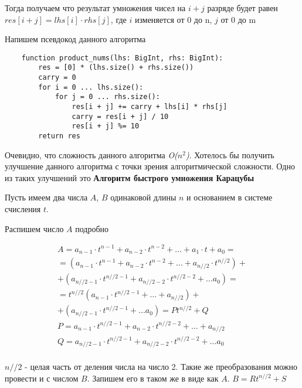 \documentclass[a4paper,article,14pt]{extarticle}
\begin{document}
Тогда получаем что результат умножения чисел на $i + j$ разряде будет равен $ res[i + j]  = lhs[i] \cdot rhs[j] $,
где $i$ изменяется от 0 до n, $j$ от 0 до m 

Напишем псевдокод данного алгоритма

\begin{lstlisting}
    function product_nums(lhs: BigInt, rhs: BigInt):
        res = [0] * (lhs.size() + rhs.size())
        carry = 0
        for i = 0 ... lhs.size():
            for j = 0 ... rhs.size():
                res[i + j] += carry + lhs[i] * rhs[j]
                carry = res[i + j] / 10
                res[i + j] %= 10  
        return res
\end{lstlisting}

Очевидно, что сложность данного алгоритма \emph{O($n^2$)}.
Хотелось бы получить улучшение данного алгоритма с точки зрения алгоритмической сложности.
Одно из таких улучшений это \textbf{Алгоритм быстрого умножения Карацубы}

Пусть имеем два числа $A$, $B$ одинаковой длины $n$ и основанием 
в системе счисления $t$. 

Распишем число $A$ подробно

\begin{equation}
    \begin{split}
        A = a_{n - 1} \cdot t^{n - 1} + a_{n - 2} \cdot t^{n - 2} + \dots + a_1 \cdot t + a_0 = \\
        = \left(a_{n - 1} \cdot t^{n - 1} + a_{n - 2} \cdot t^{n - 2} + \dots + a_{n // 2} \cdot t^{n // 2}  \right) + \\
        + \left(a_{n // 2 - 1} \cdot t ^ {n // 2 - 1} + a_{n // 2 - 2} \cdot t ^ {n // 2 - 2} + \dots a_0 \right) = \\
        = t ^ {n // 2} \left(a_{n - 1} \cdot t ^ {n // 2 - 1} + \dots + a_{n // 2} \right) + \\ 
        + \left(a_{n // 2 - 1} \cdot t ^ {n // 2 - 1} + \dots a_0 \right) = Pt^{n // 2} + Q \\
        P = a_{n - 1} \cdot t ^ {n // 2 - 1} + a_{n - 2} \cdot t ^ {n // 2 - 2}  + \dots + a_{n // 2} \\
        Q = a_{n // 2 - 1} \cdot t ^ {n // 2 - 1} + a_{n // 2 - 2} \cdot t ^ {n // 2 - 2} + \dots a_0 \\
    \end{split}
\end{equation}

$ n // 2$ - целая часть от деления числа на число 2. Такие же преобразования можно провести и с числом $B$.
Запишем его в таком же в виде как $A$. $ B = Rt^{n // 2} + S $
\end{document}
